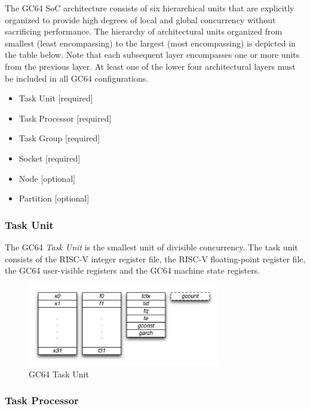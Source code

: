 \documentclass{article}
\begin{document}
The GC64 SoC architecture consists of six hierarchical units that
are explicitly organized to provide high degrees of local and global
concurrency without sacrificing performance.  The hierarchy of
architectural units organized from smallest (least encompassing)
to the largest (most encompassing) is depicted in the table below.
Note that each subsequent layer encompasses one or more units from
the previous layer.  At least one of the lower four architectural
layers must be included in all GC64 configurations.

\begin{center}
\begin{itemize}
\item Task Unit [required]
\item Task Processor [required]
\item Task Group [required]
\item Socket [required]
\item Node [optional]
\item Partition [optional]
\end{itemize}
\end{center}

\subsubsection{Task Unit}

The GC64 \emph{Task Unit} is the smallest unit of divisible concurrency.  
The task unit consists of the  RISC-V integer register file, the RISC-V
floating-point register file, the GC64 user-visible registers and the GC64
machine state registers.  

\begin{figure}[h!]
\begin{center}
\includegraphics[width=0.75\textwidth]{gc64-task-unit.png}
\caption{GC64 Task Unit}
\end{center}
\label{figure:taskunit}
\end{figure}  

\subsubsection{Task Processor}
\end{document}
